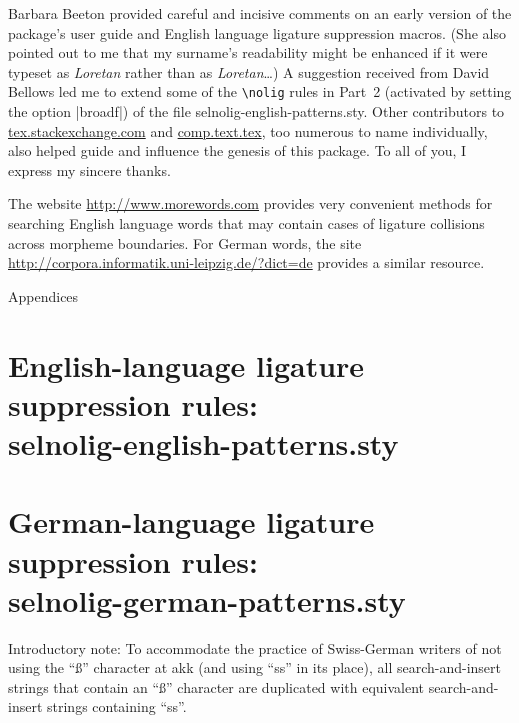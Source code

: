 \documentclass[11pt]{article}
\newcommand{\pkg}[1]{\textsf{#1}}
\newcommand{\cmmd}[1]{\texttt{\textbackslash #1}}
\let\oldappendix\appendix
\renewcommand\appendix{%
   \addtocontents{toc}{\protect{\vspace{1\baselineskip}}}
   \addtocontents{toc}{\protect{\mdseries Appendices\par}}
   \noindent
   {\Large Appendices}
   \oldappendix}
\begin{document}
Barbara Beeton provided careful and incisive comments on an early version of the package's user guide and English language ligature suppression macros. (She also pointed out to me that my surname's readability might be enhanced if it were typeset as \emph{Loretan} rather than as \emph{Lor\mbox{et}an}\dots) A suggestion received from David Bellows led me to extend some of the \cmmd{nolig} rules in Part~2 (activated by setting the option |broadf|) of the file \pkg{selnolig-english-patterns.sty}. Other contributors to \url{tex.stackexchange.com} and \url{comp.text.tex}, too numerous to name individually, also helped guide and influence the genesis of this package. To all of you, I express my sincere thanks.

The website \url{http://www.morewords.com} provides very convenient methods for searching English language words that may contain cases of ligature collisions across morpheme boundaries. For German words, the site \url{http://corpora.informatik.uni-leipzig.de/?dict=de} provides a similar resource. 



\clearpage
\appendix
\selnoligoff  %


\small %


\section[English-language ligature suppression rules: selnolig-english-patterns.sty]{English-language ligature suppression rules: \\ 
\pkg{selnolig-english-patterns.sty}}
\label{sec:eng-listing}

\begin{multicols}{2}
\end{multicols}

\clearpage
\section[German-language ligature suppression rules:
selnolig-german-patterns.sty]{German-language ligature suppression rules: \\ 
\pkg{selnolig-german-patterns.sty}}
\label{sec:germ-listing}

Introductory note: To accommodate the practice of Swiss-German writers of not using the \enquote{ß} character at akk (and using \enquote{ss} in its place), all search-and-insert strings that contain an \enquote{ß} character are duplicated with equivalent search-and-insert strings containing \enquote{ss}.
\end{document}
